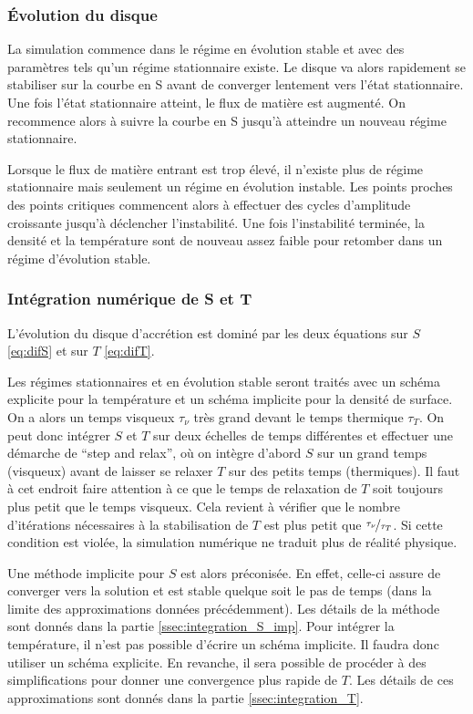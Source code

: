 \subsubsection{Évolution du disque}

La simulation commence dans le régime en évolution stable et avec des paramètres tels qu'un régime stationnaire existe. Le disque va alors rapidement se stabiliser sur la courbe en S avant de converger lentement vers l'état stationnaire. Une fois l'état stationnaire atteint, le flux de matière est augmenté. On recommence alors à suivre la courbe en S jusqu'à atteindre un nouveau régime stationnaire.

Lorsque le flux de matière entrant est trop élevé, il n'existe plus de régime stationnaire mais seulement un régime en évolution instable. Les points proches des points critiques commencent alors à effectuer des cycles d'amplitude croissante jusqu'à déclencher l'instabilité. Une fois l'instabilité terminée, la densité et la température sont de nouveau assez faible pour retomber dans un régime d'évolution stable.

\subsubsection{Intégration numérique de S et T}

L'évolution du disque d'accrétion est dominé par les deux équations sur $S$ \eqref{eq:difS} et sur $T$ \eqref{eq:difT}.

Les régimes stationnaires et en évolution stable seront traités avec un schéma explicite pour la température et un schéma implicite pour la densité de surface. On a alors un temps visqueux $\tau_\nu$  très grand devant le temps thermique $\tau_T$. On peut donc intégrer $S$ et $T$ sur deux échelles de temps différentes et effectuer une démarche de ``step and relax'', où on intègre d'abord $S$ sur un grand temps (visqueux) avant de laisser se relaxer $T$ sur des petits temps (thermiques). Il faut à cet endroit faire attention à ce que le temps de relaxation de $T$ soit toujours plus petit que le temps visqueux. Cela revient à vérifier que le nombre d'itérations nécessaires à la stabilisation de $T$ est plus petit que $\nicefrac{\tau_\nu}{\tau_T}$. Si cette condition est violée, la simulation numérique ne traduit plus de réalité physique. 

Une méthode implicite pour $S$ est alors préconisée. En effet, celle-ci assure de converger vers la solution et est stable quelque soit le pas de temps (dans la limite des approximations données précédemment). Les détails de la méthode sont donnés dans la partie \ref{ssec:integration_S_imp}. Pour intégrer la température, il n'est pas possible d'écrire un schéma implicite. Il faudra donc utiliser un schéma explicite. En revanche, il sera possible de procéder à des simplifications pour donner une convergence plus rapide de $T$. Les détails de ces approximations sont donnés dans la partie \ref{ssec:integration_T}.

